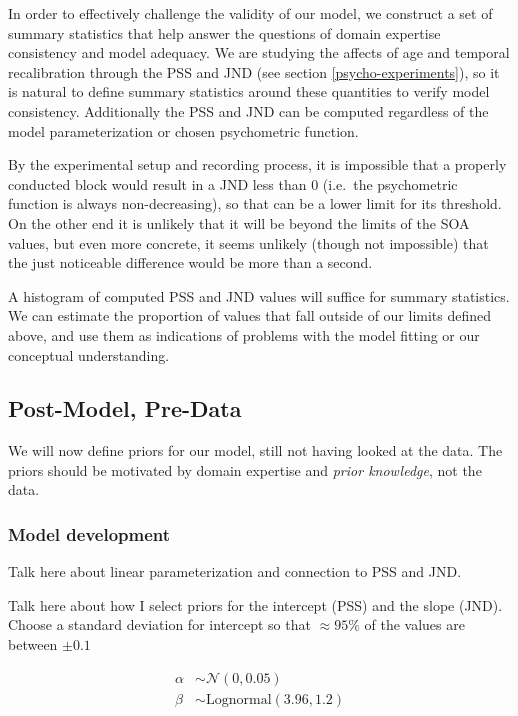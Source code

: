 \documentclass[11pt, oneside, openany]{scrbook}
\begin{document}
In order to effectively challenge the validity of our model, we construct a set of summary statistics that help answer the questions of domain expertise consistency and model adequacy. We are studying the affects of age and temporal recalibration through the PSS and JND (see section \ref{psycho-experiments}), so it is natural to define summary statistics around these quantities to verify model consistency. Additionally the PSS and JND can be computed regardless of the model parameterization or chosen psychometric function.

By the experimental setup and recording process, it is impossible that a properly conducted block would result in a JND less than 0 (i.e.~the psychometric function is always non-decreasing), so that can be a lower limit for its threshold. On the other end it is unlikely that it will be beyond the limits of the SOA values, but even more concrete, it seems unlikely (though not impossible) that the just noticeable difference would be more than a second.

A histogram of computed PSS and JND values will suffice for summary statistics. We can estimate the proportion of values that fall outside of our limits defined above, and use them as indications of problems with the model fitting or our conceptual understanding.

\hypertarget{post-model-pre-data}{%
\subsection{Post-Model, Pre-Data}\label{post-model-pre-data}}

We will now define priors for our model, still not having looked at the data. The priors should be motivated by domain expertise and \emph{prior knowledge}, not the data.

\hypertarget{iter1-model-dev}{%
\subsubsection{Model development}\label{iter1-model-dev}}

Talk here about linear parameterization and connection to PSS and JND.

Talk here about how I select priors for the intercept (PSS) and the slope (JND). Choose a standard deviation for intercept so that \(\approx 95\%\) of the values are between \(\pm 0.1\)

\begin{align*}
\alpha &\sim \mathcal{N}(0, 0.05) \\
\beta &\sim \mathrm{Lognormal}(3.96, 1.2)
\end{align*}
\end{document}
